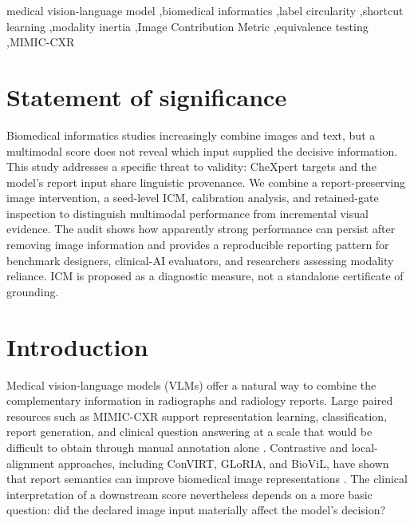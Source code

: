 \documentclass[a4paper,fleqn]{cas-sc}
\begin{document}
\begin{keywords}
medical vision-language model \sep biomedical informatics \sep label circularity
\sep shortcut learning \sep modality inertia \sep Image Contribution Metric
\sep equivalence testing \sep MIMIC-CXR
\end{keywords}

\begingroup
\sloppy
\maketitle
\endgroup

\section*{Statement of significance}
Biomedical informatics studies increasingly combine images and text, but a
multimodal score does not reveal which input supplied the decisive information.
This study addresses a specific threat to validity: CheXpert targets and the
model's report input share linguistic provenance. We combine a report-preserving
image intervention, a seed-level ICM, calibration analysis, and retained-gate
inspection to distinguish multimodal performance from incremental visual
evidence. The audit shows how apparently strong performance can persist after
removing image information and provides a reproducible reporting pattern for
benchmark designers, clinical-AI evaluators, and researchers assessing modality
reliance. ICM is proposed as a diagnostic measure, not a standalone certificate
of grounding.

\section{Introduction}\label{sec:introduction}

Medical vision-language models (VLMs) offer a natural way to combine the
complementary information in radiographs and radiology reports. Large paired
resources such as MIMIC-CXR support representation learning, classification,
report generation, and clinical question answering at a scale that would be
difficult to obtain through manual annotation alone \cite{johnson2019mimiccxr}.
Contrastive and local-alignment approaches, including ConVIRT, GLoRIA, and
BioViL, have shown that report semantics can improve biomedical image
representations \cite{zhang2022convirt,huang2021gloria,boecking2022textsemantics}.
The clinical interpretation of a downstream score nevertheless depends on a
more basic question: did the declared image input materially affect the model's
decision?
\end{document}
